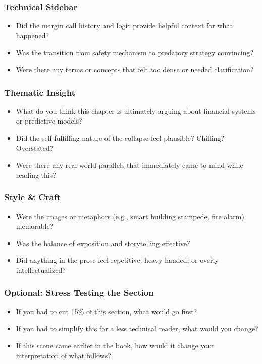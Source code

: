 \subsubsection{Technical Sidebar}

\begin{itemize}
  \item Did the margin call history and logic provide helpful context for what happened?
  \item Was the transition from safety mechanism to predatory strategy convincing?
  \item Were there any terms or concepts that felt too dense or needed clarification?
\end{itemize}

\subsubsection{Thematic Insight}

\begin{itemize}
  \item What do you think this chapter is ultimately arguing about financial systems or predictive models?
  \item Did the self-fulfilling nature of the collapse feel plausible? Chilling? Overstated?
  \item Were there any real-world parallels that immediately came to mind while reading this?
\end{itemize}

\subsubsection{Style \& Craft}

\begin{itemize}
  \item Were the images or metaphors (e.g., smart building stampede, fire alarm) memorable?
  \item Was the balance of exposition and storytelling effective?
  \item Did anything in the prose feel repetitive, heavy-handed, or overly intellectualized?
\end{itemize}

\subsubsection{Optional: Stress Testing the Section}

\begin{itemize}
  \item If you had to cut 15\% of this section, what would go first?
  \item If you had to simplify this for a less technical reader, what would you change?
  \item If this scene came earlier in the book, how would it change your interpretation of what follows?
\end{itemize}


